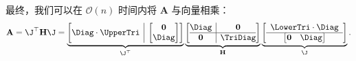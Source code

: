 最终，我们可以在 $\mathcal{O}(n)$ 时间内将 $\mathbf{A}$ 与向量相乘：
\begin{equation}
  \mathbf{A} = \J^{\top}\mathbf{H}\J =
  \underbrace{
    \left[
      \begin{array}{@{}c|c@{}}
        \Diag \cdot \UpperTri &
        \begin{bmatrix}
          \mathbf{0} \\
          \Diag
        \end{bmatrix}
      \end{array}
      \right]}_{\J^{\top}}
  \underbrace{
    \left[
      \begin{array}{@{}c|c@{}}
        \Diag      & \mathbf{0} \\
        \hline
        \mathbf{0} & \TriDiag
      \end{array}
      \right]}_{\mathbf{H}}
  \underbrace{
    \left[
      \begin{array}{c}
        \LowerTri \cdot \Diag \\
        \hline
        \begin{bmatrix}
          \mathbf{0} & \Diag \\
        \end{bmatrix}
      \end{array}
      \right]}_{\J}.
\end{equation}